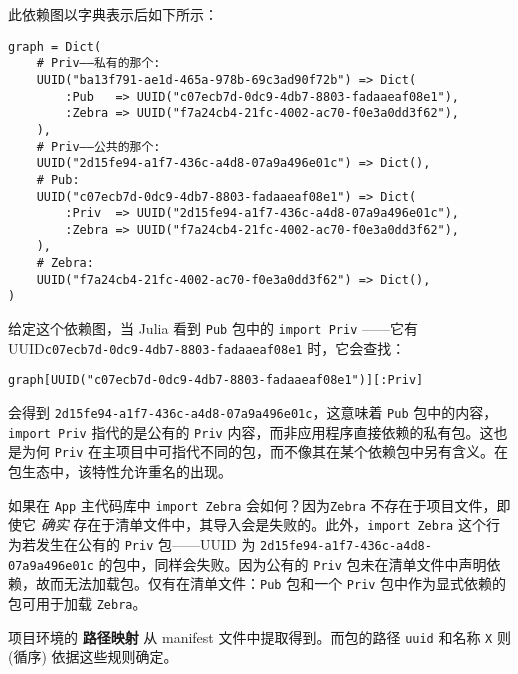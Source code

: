 此依赖图以字典表示后如下所示：




\begin{verbatim}
graph = Dict(
    # Priv——私有的那个:
    UUID("ba13f791-ae1d-465a-978b-69c3ad90f72b") => Dict(
        :Pub   => UUID("c07ecb7d-0dc9-4db7-8803-fadaaeaf08e1"),
        :Zebra => UUID("f7a24cb4-21fc-4002-ac70-f0e3a0dd3f62"),
    ),
    # Priv——公共的那个:
    UUID("2d15fe94-a1f7-436c-a4d8-07a9a496e01c") => Dict(),
    # Pub:
    UUID("c07ecb7d-0dc9-4db7-8803-fadaaeaf08e1") => Dict(
        :Priv  => UUID("2d15fe94-a1f7-436c-a4d8-07a9a496e01c"),
        :Zebra => UUID("f7a24cb4-21fc-4002-ac70-f0e3a0dd3f62"),
    ),
    # Zebra:
    UUID("f7a24cb4-21fc-4002-ac70-f0e3a0dd3f62") => Dict(),
)
\end{verbatim}



给定这个依赖图，当 Julia 看到 \texttt{Pub} 包中的 \texttt{import Priv} ——它有 UUID\texttt{c07ecb7d-0dc9-4db7-8803-fadaaeaf08e1} 时，它会查找：




\begin{verbatim}
graph[UUID("c07ecb7d-0dc9-4db7-8803-fadaaeaf08e1")][:Priv]
\end{verbatim}



会得到 \texttt{2d15fe94-a1f7-436c-a4d8-07a9a496e01c}，这意味着 \texttt{Pub} 包中的内容，\texttt{import Priv} 指代的是公有的 \texttt{Priv} 内容，而非应用程序直接依赖的私有包。这也是为何 \texttt{Priv} 在主项目中可指代不同的包，而不像其在某个依赖包中另有含义。在包生态中，该特性允许重名的出现。



如果在 \texttt{App} 主代码库中 \texttt{import Zebra} 会如何？因为\texttt{Zebra} 不存在于项目文件，即使它 \emph{确实} 存在于清单文件中，其导入会是失败的。此外，\texttt{import Zebra} 这个行为若发生在公有的 \texttt{Priv} 包——UUID 为 \texttt{2d15fe94-a1f7-436c-a4d8-07a9a496e01c} 的包中，同样会失败。因为公有的 \texttt{Priv} 包未在清单文件中声明依赖，故而无法加载包。仅有在清单文件：\texttt{Pub} 包和一个 \texttt{Priv} 包中作为显式依赖的包可用于加载 \texttt{Zebra}。



项目环境的 \textbf{路径映射} 从 manifest 文件中提取得到。而包的路径 \texttt{uuid} 和名称 \texttt{X} 则 (循序) 依据这些规则确定。



